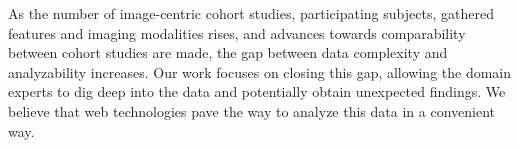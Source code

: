 \documentclass[journal]{style/vgtc} 			          %
\begin{document}
%
%
As the number of image-centric cohort studies, participating subjects, gathered features and imaging modalities rises, and advances towards comparability between cohort studies are made, the gap between data complexity and analyzability increases.
%
Our work focuses on closing this gap, allowing the domain experts to dig deep into the data and potentially obtain unexpected findings.
%
We believe that web technologies pave the way to analyze this data in a convenient way.
%
%
\end{document}
